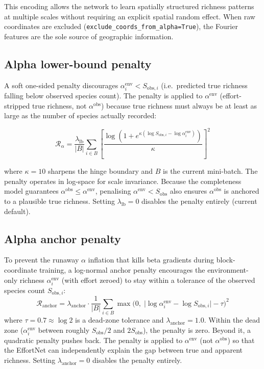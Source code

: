 \documentclass{article}
\begin{document}
This encoding allows the network to learn spatially structured richness patterns at multiple scales without requiring an explicit spatial random effect. When raw coordinates are excluded (\texttt{exclude\_coords\_from\_alpha=True}), the Fourier features are the sole source of geographic information.

\subsection{Alpha lower-bound penalty}

A soft one-sided penalty discourages $\alpha_i^{\text{env}} < S_{\text{obs},i}$ (i.e.\ predicted true richness falling below observed species count).  The penalty is applied to $\alpha^{\text{env}}$ (effort-stripped true richness, not $\alpha^{\text{obs}}$) because true richness must always be at least as large as the number of species actually recorded:

\begin{equation}
    \mathcal{R}_\alpha = \frac{\lambda_{\text{lb}}}{|B|}\sum_{i \in B}\left[\frac{\log(1 + e^{\kappa(\log S_{\text{obs},i} - \log \alpha_i^{\text{env}})})}{\kappa}\right]^2
\end{equation}

where $\kappa = 10$ sharpens the hinge boundary and $B$ is the current mini-batch.  The penalty operates in log-space for scale invariance.  Because the completeness model guarantees $\alpha^{\text{obs}} \le \alpha^{\text{env}}$, penalising $\alpha^{\text{env}} < S_{\text{obs}}$ also ensures $\alpha^{\text{obs}}$ is anchored to a plausible true richness.  Setting $\lambda_{\text{lb}} = 0$ disables the penalty entirely (current default).

\subsection{Alpha anchor penalty}
\label{sec:alpha-anchor}

To prevent the runaway $\alpha$ inflation that kills beta gradients during block-coordinate training, a log-normal anchor penalty encourages the environment-only richness $\alpha_i^{\text{env}}$ (with effort zeroed) to stay within a tolerance of the observed species count $S_{\text{obs},i}$:
\begin{equation}
    \mathcal{R}_{\text{anchor}} = \lambda_{\text{anchor}} \cdot \frac{1}{|B|} \sum_{i \in B} \max\!\Big(0,\; \big|\log \alpha_i^{\text{env}} - \log S_{\text{obs},i}\big| - \tau\Big)^2
\end{equation}
where $\tau = 0.7 \approx \log 2$ is a dead-zone tolerance and $\lambda_{\text{anchor}} = 1.0$. Within the dead zone ($\alpha_i^{\text{env}}$ between roughly $S_{\text{obs}}/2$ and $2 S_{\text{obs}}$), the penalty is zero. Beyond it, a quadratic penalty pushes back. The penalty is applied to $\alpha^{\text{env}}$ (not $\alpha^{\text{obs}}$) so that the EffortNet can independently explain the gap between true and apparent richness. Setting $\lambda_{\text{anchor}} = 0$ disables the penalty entirely.
\end{document}
